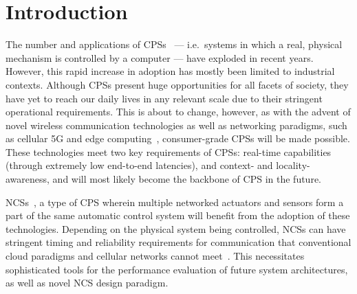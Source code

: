 \section{Introduction}\label{paper:olguinmunoz2022cleave:intro}

The number and applications of \glspl{CPS}~\cite{rajkumar2010cyber} --- i.e.\ systems in which a real, physical mechanism is controlled by a computer --- have exploded in recent years.
However, this rapid increase in adoption has mostly been limited to industrial contexts.
Although \glspl{CPS} present huge opportunities for all facets of society, they have yet to reach our daily lives in any relevant scale due to their stringent operational requirements.
This is about to change, however, as with the advent of novel wireless communication technologies as well as networking paradigms, such as cellular 5G and edge computing~\cite{satyanarayanan2017emergence}, consumer-grade \glspl{CPS} will be made possible.
These technologies meet two key requirements of \glspl{CPS}: real-time capabilities (through extremely low end-to-end latencies), and context- and locality-awareness, and will most likely become the backbone of \gls{CPS} in the future.

\glspl{NCS}~\cite{gupta2010networked}, a type of \gls{CPS} wherein multiple networked actuators and sensors form a part of the same automatic control system will benefit from the adoption of these technologies.
Depending on the physical system being controlled, \glspl{NCS} can have stringent timing and reliability requirements for communication that conventional cloud paradigms and cellular networks cannot meet~\cite{wan2020efficient}.
This necessitates sophisticated tools for the performance evaluation of future system architectures, as well as novel NCS design paradigm.


